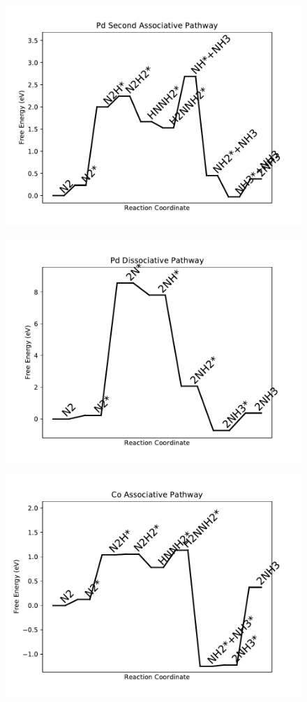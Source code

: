 \begin{figure}
\centering
\includegraphics[width=0.8\linewidth]{data/plots/Pd_associative_2.pdf}
\end{figure}

\begin{figure}
\centering
\includegraphics[width=0.8\linewidth]{data/plots/Pd_dissociative.pdf}
\end{figure}

\begin{figure}
\centering
\includegraphics[width=0.8\linewidth]{data/plots/Co_associative.pdf}
\end{figure}

